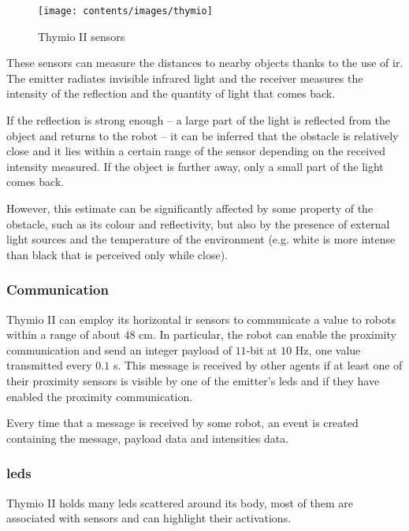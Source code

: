 \begin{figure}[h!tb]
	\centering
	\texttt{[image: contents/images/thymio]}
	\caption{Thymio II sensors}
	\label{fig:thymio sensors}
\end{figure}

These sensors can measure the distances to nearby objects thanks to the use 
of  \gls{ir}. The emitter radiates invisible infrared light and the receiver 
measures the intensity of the reflection and the quantity of light that comes 
back.

If the reflection is strong enough – a large part of the light is reflected from 
the object and returns to the robot – it can be inferred that the obstacle is 
relatively close and it lies within a certain range of the sensor depending on 
the received intensity measured. If the object is farther away, only a small 
part of the light comes back.

However, this estimate can be significantly affected by some property of the 
obstacle, such as its colour and reflectivity, but also by the presence of 
external light sources and the temperature of the environment (e.g. white is 
more intense than black that is perceived only while close).

\subsubsection{Communication}
\label{subsec:thymiocomm}

Thymio II can employ its horizontal \gls{ir} sensors to communicate a value 
to robots within a range of about $48$ \gls{cm}. 
In particular, the robot can enable the proximity communication and send an 
integer payload of $11$-bit at $10$ \gls{Hz}, one value transmitted every $0.1$ 
\gls{s}. 
This message is received by other agents if at least one of their proximity sensors 
is visible by one of the emitter’s \glspl{led} and if they have enabled the proximity 
communication.

Every time that a message is received by some robot, an event is 
created containing the message, payload data and intensities data.

\subsubsection{\glspl{led}}
\label{subsec:thymioled}

Thymio II holds many \glspl{led} scattered around its body, most of them are 
associated 
with sensors and can highlight their activations.


